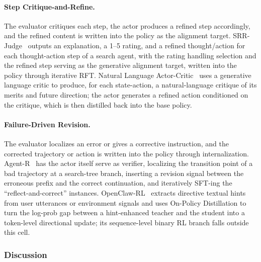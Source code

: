 \paragraph{Step Critique-and-Refine.} The evaluator critiques each step, the actor produces a refined step accordingly, and the refined content is written into the policy as the alignment target. SRR-Judge~\cite{Zha26am} outputs an explanation, a 1--5 rating, and a refined thought/action for each thought-action step of a search agent, with the rating handling selection and the refined step serving as the generative alignment target, written into the policy through iterative RFT. Natural Language Actor-Critic~\cite{Hon25c} uses a generative language critic to produce, for each state-action, a natural-language critique of its merits and future direction; the actor generates a refined action conditioned on the critique, which is then distilled back into the base policy.

\paragraph{Failure-Driven Revision.} The evaluator localizes an error or gives a corrective instruction, and the corrected trajectory or action is written into the policy through internalization. Agent-R~\cite{Yua25c} has the actor itself serve as verifier, localizing the transition point of a bad trajectory at a search-tree branch, inserting a revision signal between the erroneous prefix and the correct continuation, and iteratively SFT-ing the ``reflect-and-correct'' instances. OpenClaw-RL~\cite{Wan26ad} extracts directive textual hints from user utterances or environment signals and uses On-Policy Distillation to turn the log-prob gap between a hint-enhanced teacher and the student into a token-level directional update; its sequence-level binary RL branch falls outside this cell.

\subsubsection{Discussion}
\label{sec:edo-discussion}

